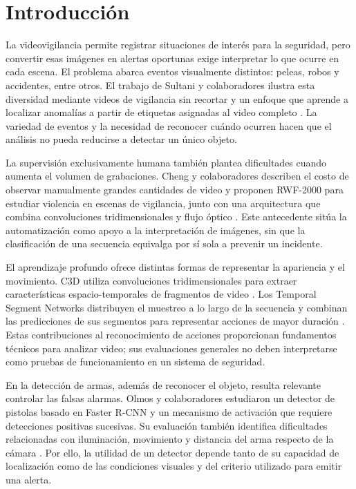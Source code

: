 \documentclass[pdflatex,sn-mathphys-num]{sn-jnl}%
\theoremstyle{thmstyleone}%
\theoremstyle{thmstyletwo}%
\theoremstyle{thmstylethree}%
\begin{document}
\section{Introducción}\label{sec1}

La videovigilancia permite registrar situaciones de interés para la seguridad, pero convertir esas imágenes en alertas oportunas exige interpretar lo que ocurre en cada escena. El problema abarca eventos visualmente distintos: peleas, robos y accidentes, entre otros. El trabajo de Sultani y colaboradores ilustra esta diversidad mediante videos de vigilancia sin recortar y un enfoque que aprende a localizar anomalías a partir de etiquetas asignadas al video completo \cite{sultani2018}. La variedad de eventos y la necesidad de reconocer cuándo ocurren hacen que el análisis no pueda reducirse a detectar un único objeto.

La supervisión exclusivamente humana también plantea dificultades cuando aumenta el volumen de grabaciones. Cheng y colaboradores describen el costo de observar manualmente grandes cantidades de video y proponen RWF-2000 para estudiar violencia en escenas de vigilancia, junto con una arquitectura que combina convoluciones tridimensionales y flujo óptico \cite{cheng2021}. Este antecedente sitúa la automatización como apoyo a la interpretación de imágenes, sin que la clasificación de una secuencia equivalga por sí sola a prevenir un incidente.

El aprendizaje profundo ofrece distintas formas de representar la apariencia y el movimiento. C3D utiliza convoluciones tridimensionales para extraer características espacio-temporales de fragmentos de video \cite{tran2015}. Los Temporal Segment Networks distribuyen el muestreo a lo largo de la secuencia y combinan las predicciones de sus segmentos para representar acciones de mayor duración \cite{wang2016}. Estas contribuciones al reconocimiento de acciones proporcionan fundamentos técnicos para analizar video; sus evaluaciones generales no deben interpretarse como pruebas de funcionamiento en un sistema de seguridad.

En la detección de armas, además de reconocer el objeto, resulta relevante controlar las falsas alarmas. Olmos y colaboradores estudiaron un detector de pistolas basado en Faster R-CNN y un mecanismo de activación que requiere detecciones positivas sucesivas. Su evaluación también identifica dificultades relacionadas con iluminación, movimiento y distancia del arma respecto de la cámara \cite{olmos2018}. Por ello, la utilidad de un detector depende tanto de su capacidad de localización como de las condiciones visuales y del criterio utilizado para emitir una alerta.
\end{document}
